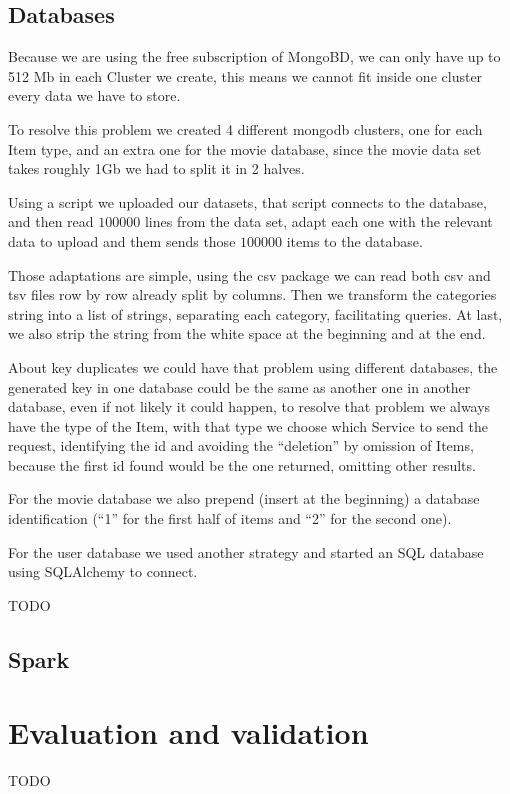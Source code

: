 \documentclass[oneside]{article}
\newcommand*\fpar{\hspace{1ex}}
\begin{document}
    \subsection{Databases}
    \fpar Because we are using the free subscription of MongoBD, we can only have up to 512 Mb in each Cluster we create, this means we cannot fit inside one cluster every data we have to store.
    \par To resolve this problem we created 4 different mongodb clusters, one for each Item type, and an extra one for the movie database, since the movie data set takes roughly 1Gb we had to split it in 2 halves.
    \par Using a script we uploaded our datasets, that script connects to the database, and then read $100000$ lines from the data set, adapt each one with the relevant data to upload and them sends those $100000$ items to the database. 
    \par Those adaptations are simple, using the csv package we can read both csv and tsv files row by row already split by columns. Then we transform the categories string into a list of strings, separating each category, facilitating queries. At last, we also strip the string from the white space at the beginning and at the end.
    \par About key duplicates we could have that problem using different databases, the generated key in one database could be the same as another one in another database, even if not likely it could happen, to resolve that problem we always have the type of the Item, with that type we choose which Service to send the request, identifying the id and avoiding the “deletion” by omission of Items, because the first id found would be the one returned, omitting other results.
    \par For the movie database we also prepend (insert at the beginning) a database identification (“1” for the first half of items and “2” for the second one).
    \par For the user database we used another strategy and started an SQL database using SQLAlchemy to connect.
    \par TODO

    \subsection{Spark}


\section{Evaluation and validation}
\label{sec:evaluation_and_validation}
\fpar TODO
\end{document}
